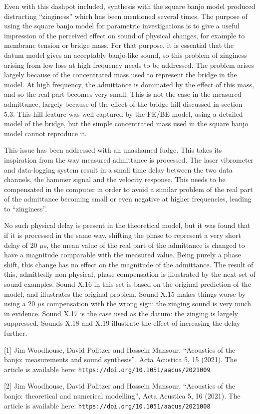   Even with this dashpot included, synthesis with the square banjo model 
  produced distracting ``zinginess'' which has been mentioned several times. 
  The purpose of using the square banjo model for parametric investigations is 
  to give a useful impression of the perceived effect on sound of physical 
  changes, for example to membrane tension or bridge mass. For that purpose, it 
  is essential that the datum model gives an acceptably banjo-like sound, so 
  this problem of zinginess arising from low loss at high frequency needs to be 
  addressed. The problem arises largely because of the concentrated mass used 
  to represent the bridge in the model. At high frequency, the admittance is 
  dominated by the effect of this mass, and so the real part becomes very 
  small. This is not the case in the measured admittance, largely because of 
  the effect of the bridge hill discussed in section 5.3. This hill feature was 
  well captured by the FE/BE model, using a detailed model of the bridge, but 
  the simple concentrated mass used in the square banjo model cannot reproduce 
  it. 

  This issue has been addressed with an unashamed fudge. This takes its 
  inspiration from the way measured admittance is processed. The laser 
  vibrometer and data-logging system result in a small time delay between the 
  two data channels, the hammer signal and the velocity response. This needs to 
  be compensated in the computer in order to avoid a similar problem of the 
  real part of the admittance becoming small or even negative at higher 
  frequencies, leading to ``zinginess''. 

  No such physical delay is present in the theoretical model, but it was found 
  that if it is processed in the same way, shifting the phase to represent a 
  very short delay of 20 $\mu$s, the mean value of the real part of the 
  admittance is changed to have a magnitude comparable with the measured value. 
  Being purely a phase shift, this change has no effect on the magnitude of the 
  admittance. The result of this, admittedly non-physical, phase compensation 
  is illustrated by the next set of sound examples. Sound X.16 in this set is 
  based on the original prediction of the model, and illustrates the original 
  problem. Sound X.15 makes things worse by using a 20 $\mu$s compensation with 
  the wrong sign: the zinging sound is very much in evidence. Sound X.17 is the 
  case used as the datum: the zinging is largely suppressed. Sounds X.18 and 
  X.19 illustrate the effect of increasing the delay further. 

  \sectionreferences{}[1] Jim Woodhouse, David Politzer and Hossein Mansour. 
  “Acoustics of the banjo: measurements and sound synthesis”, Acta Acustica 5, 
  15 (2021). The article is available here: 
  \tt{}https://doi.org/10.1051/aacus/2021009\rm{} 

  [2] Jim Woodhouse, David Politzer and Hossein Mansour. “Acoustics of the 
  banjo: theoretical and numerical modelling”, Acta Acustica 5, 16 (2021). The 
  article is available here: \tt{}https://doi.org/10.1051/aacus/2021008\rm{} 